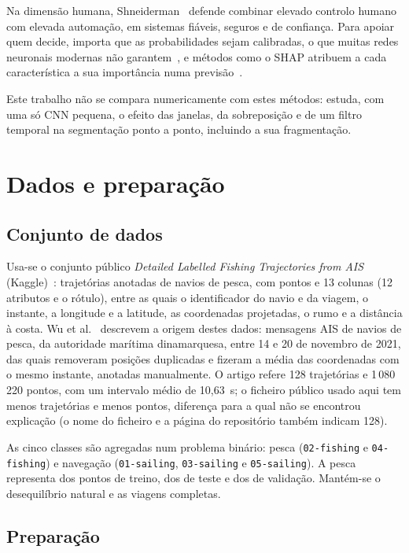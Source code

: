 \documentclass{article}
\begin{document}
Na dimensão humana, Shneiderman~ defende combinar elevado controlo humano com elevada automação, em sistemas fiáveis, seguros e de confiança. Para apoiar quem decide, importa que as probabilidades sejam calibradas, o que muitas redes neuronais modernas não garantem~\cite{guo2017}, e métodos como o SHAP atribuem a cada característica a sua importância numa previsão~\cite{lundberg2017}.

Este trabalho não se compara numericamente com estes métodos: estuda, com uma só CNN pequena, o efeito das janelas, da sobreposição e de um filtro temporal na segmentação ponto a ponto, incluindo a sua fragmentação.

\section{Dados e preparação}
\label{sec:dados}
\subsection{Conjunto de dados}

Usa-se o conjunto público \emph{Detailed Labelled Fishing Trajectories from AIS} (Kaggle)~\cite{kaggleAIS}: \resDadosViagens{} trajetórias anotadas de navios de pesca, com \resDadosLinhas{} pontos e 13 colunas (12 atributos e o rótulo), entre as quais o identificador do navio e da viagem, o instante, a longitude e a latitude, as coordenadas projetadas, o rumo e a distância à costa. Wu et al.~ descrevem a origem destes dados: mensagens AIS de navios de pesca, da autoridade marítima dinamarquesa, entre 14 e 20 de novembro de 2021, das quais removeram posições duplicadas e fizeram a média das coordenadas com o mesmo instante, anotadas manualmente. O artigo refere 128 trajetórias e 1\,080\,220 pontos, com um intervalo médio de 10,63~s; o ficheiro público usado aqui tem menos trajetórias e menos pontos, diferença para a qual não se encontrou explicação (o nome do ficheiro e a página do repositório também indicam 128).

As cinco classes são agregadas num problema binário: pesca (\texttt{02-fishing} e \texttt{04-fishing}) e navegação (\texttt{01-sailing}, \texttt{03-sailing} e \texttt{05-sailing}). A pesca representa \resDadosPercPesca{} dos pontos de treino, \resTestePercPesca{} dos de teste e \resVaPercPesca{} dos de validação. Mantém-se o desequilíbrio natural e as viagens completas.

\subsection{Preparação}
\end{document}
